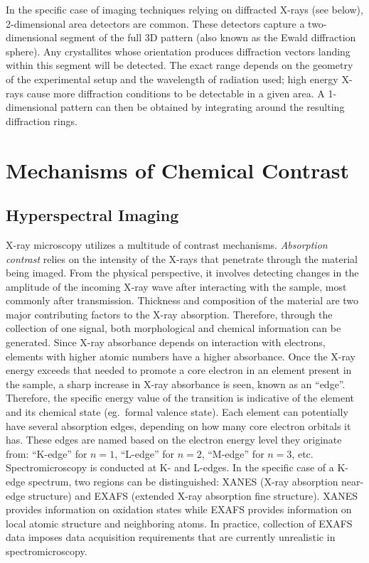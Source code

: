 \documentclass[journal=cmatex,manuscript=perspective]{achemso}
\begin{document}
In the specific case of imaging techniques relying on diffracted
X-rays (see below), 2-dimensional area detectors are common. These
detectors capture a two-dimensional segment of the full 3D pattern
(also known as the Ewald diffraction sphere). Any crystallites whose
orientation produces diffraction vectors landing within this segment
will be detected. The exact range depends on the geometry of the
experimental setup and the wavelength of radiation used; high energy
X-rays cause more diffraction conditions to be detectable in a given
area. A 1-dimensional pattern can then be obtained by integrating
around the resulting diffraction rings.


\section{Mechanisms of Chemical Contrast}

\subsection{Hyperspectral Imaging}

X-ray microscopy utilizes a multitude of contrast
mechanisms. \emph{Absorption contrast} relies on the intensity of the
X-rays that penetrate through the material being imaged. From the
physical perspective, it involves detecting changes in the amplitude
of the incoming X-ray wave after interacting with the sample, most
commonly after transmission. Thickness and composition of the material
are two major contributing factors to the X-ray absorption. Therefore,
through the collection of one signal, both morphological and chemical
information can be generated. Since X-ray absorbance depends on
interaction with electrons, elements with higher atomic numbers have a
higher absorbance. Once the X-ray energy exceeds that needed to
promote a core electron in an element present in the sample, a sharp
increase in X-ray absorbance is seen, known as an ``edge''. Therefore,
the specific energy value of the transition is indicative of the
element and its chemical state (eg.\ formal valence state). Each
element can potentially have several absorption edges, depending on
how many core electron orbitals it has. These edges are named based on
the electron energy level they originate from: ``K-edge'' for $n=1$,
``L-edge'' for $n=2$, ``M-edge'' for $n=3$, etc. Spectromicroscopy is
conducted at K- and L-edges. In the specific case of a K-edge
spectrum, two regions can be distinguished: XANES (X-ray absorption
near-edge structure) and EXAFS (extended X-ray absorption fine
structure). XANES provides information on oxidation states while EXAFS
provides information on local atomic structure and neighboring
atoms. In practice, collection of EXAFS data imposes data acquisition
requirements that are currently unrealistic in spectromicroscopy.
\end{document}
